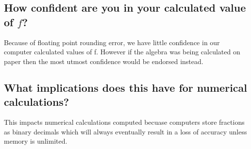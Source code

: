 \documentclass[12pt]{article}
\begin{document}
\subsection*{How confident are you in your calculated value of $f$?}
\item Because of floating point rounding error, we have little confidence in our computer calculated values of f. However if the algebra was being calculated on paper then the most utmost confidence would be endorsed instead. 
\subsection*{What implications does this have for numerical calculations?}
\item This impacts numerical calculations computed becuase computers store fractions as binary decimals which will always eventually result in a loss of accuracy unless memory is unlimited.
\end{document}
